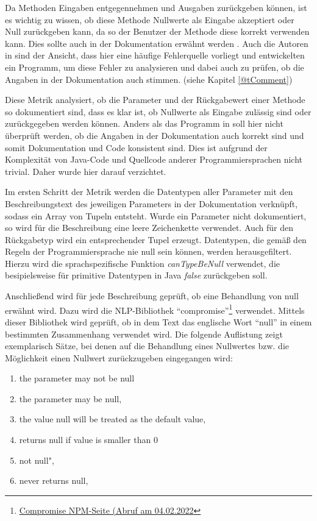  Da Methoden Eingaben entgegennehmen und Ausgaben zurückgeben können, ist es wichtig zu wissen, ob diese Methode Nullwerte als Eingabe akzeptiert oder Null zurückgeben kann, da so der Benutzer der Methode diese korrekt verwenden kann. Dies sollte auch in der Dokumentation erwähnt werden \cite{javadoc_coding_standards}. Auch die Autoren in \cite[S. 260 ff.]{@tComment:TestingJavadocCommentstoDetectComment-CodeInconsistencies} sind der Ansicht, dass hier eine häufige Fehlerquelle vorliegt und entwickelten ein Programm, um diese Fehler zu analysieren und dabei auch zu prüfen, ob die Angaben in der Dokumentation auch stimmen. (siehe Kapitel \ref{@tComment})
 
 Diese Metrik analysiert, ob die Parameter und der Rückgabewert einer Methode so dokumentiert sind, dass es klar ist, ob Nullwerte als Eingabe zulässig sind oder zurückgegeben werden können. Anders als das Programm in \cite[S. 260 ff.]{@tComment:TestingJavadocCommentstoDetectComment-CodeInconsistencies} soll hier nicht überprüft werden, ob die Angaben in der Dokumentation auch korrekt sind und somit Dokumentation und Code konsistent sind. Dies ist aufgrund der Komplexität von Java-Code und Quellcode anderer Programmiersprachen nicht trivial. Daher wurde hier darauf verzichtet.
 
 Im ersten Schritt der Metrik werden die Datentypen aller Parameter mit den Beschreibungstext des jeweiligen Parameters in der Dokumentation verknüpft, sodass ein Array von Tupeln entsteht. Wurde ein Parameter nicht dokumentiert, so wird für die Beschreibung eine leere Zeichenkette verwendet. Auch für den Rückgabetyp wird ein entsprechender Tupel erzeugt. Datentypen, die gemäß den Regeln der Programmiersprache nie null sein können, werden herausgefiltert. Hierzu wird die sprachspezifische Funktion \textit{canTypeBeNull} verwendet, die besipielsweise für primitive Datentypen in Java \textit{false} zurückgeben soll. 
 
 Anschließend wird für jede Beschreibung geprüft, ob eine Behandlung von null erwähnt wird. Dazu wird die \ac{NLP}-Bibliothek \enquote{compromise}\footnote{\href{https://www.npmjs.com/package/compromise?activeTab=readme}{Compromise NPM-Seite (Abruf am 04.02.2022}} verwendet. Mittels dieser Bibliothek wird geprüft, ob in dem Text das englische Wort \enquote{null} in einem bestimmten Zusammenhang verwendet wird. Die folgende Auflistung zeigt exemplarisch Sätze, bei denen auf die Behandlung eines Nullwertes bzw. die Möglichkeit einen Nullwert zurückzugeben eingegangen wird:
 \begin{enumerate}
      \item  the parameter may not be null
       \item  the parameter may be null,
       \item  the value null will be treated as the default value,
       
      \item  returns null if value is smaller than 0
       \item  not null",
       \item  never returns null,
 \end{enumerate}
 
